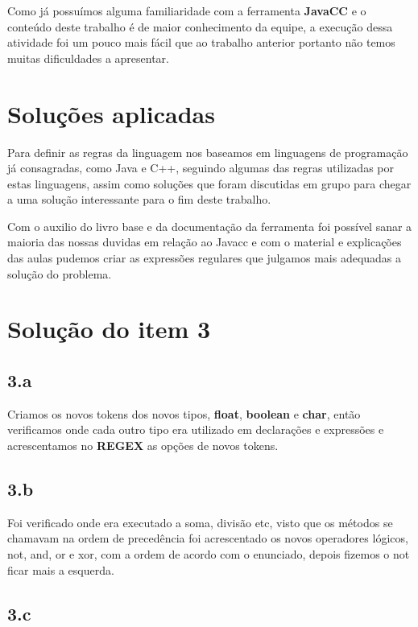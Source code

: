 \documentclass[
	article,			%
	11pt,				%
	oneside,			%
	a4paper,			%
	portuguese,			%
	brazil,				%
	sumario=tradicional
	]{abntex2}
\begin{document}
Como já possuímos alguma familiaridade com a ferramenta \textbf{JavaCC} e o conteúdo deste trabalho é de maior conhecimento da equipe, a execução dessa atividade foi um pouco mais fácil que ao trabalho anterior portanto não temos muitas dificuldades a apresentar.

\section{Soluções aplicadas}

Para definir as regras da linguagem nos baseamos em linguagens de programação já consagradas, como Java e C++, seguindo algumas das regras utilizadas por estas
linguagens, assim como soluções que foram discutidas em grupo para chegar a uma solução interessante para o fim deste trabalho.

Com o auxilio do livro base e da documentação da ferramenta foi possível  sanar a maioria das nossas duvidas em relação ao Javacc e com o material e explicações das aulas
pudemos criar as expressões regulares que julgamos mais adequadas a solução do problema.

\section{Solução do item 3}

\subsection{3.a}

Criamos os novos tokens dos novos tipos, \textbf{float}, \textbf{boolean} e \textbf{char}, então verificamos onde cada outro tipo era utilizado em declarações e expressões e acrescentamos no \textbf{REGEX} as opções de novos tokens.

\subsection{3.b}

Foi verificado onde era executado a soma, divisão etc, visto que os métodos se chamavam na ordem de precedência foi acrescentado os novos operadores lógicos, not, and, or e xor,  com a ordem de acordo com o enunciado, depois fizemos o not ficar mais a esquerda.

\subsection{3.c}
\end{document}
